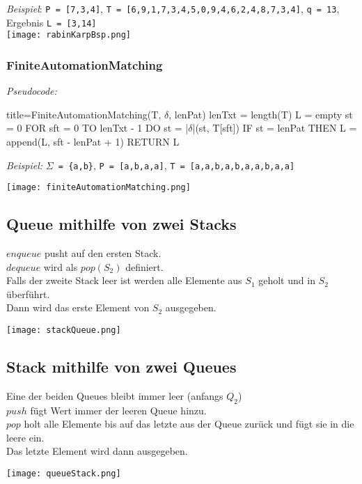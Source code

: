 \noindent
\textit{Beispiel}: \texttt{P = [7,3,4]}, \texttt{T = [6,9,1,7,3,4,5,0,9,4,6,2,4,8,7,3,4]}, \texttt{q = 13}, Ergebnis \texttt{L = [3,14]} \\
\texttt{[image: rabinKarpBsp.png]}

\subsubsection*{FiniteAutomationMatching}
\textit{Pseudocode:}
\begin{ccode}[autogobble,escapeinside=||]{title={FiniteAutomationMatching(T, $\delta$, lenPat)}}
lenTxt = length(T)
L = empty
st = 0
FOR sft = 0 TO lenTxt - 1 DO
    st = |$\delta$|(st, T[sft])
    IF st = lenPat THEN
        L = append(L, sft - lenPat + 1)
RETURN L
\end{ccode}

\noindent
\textit{Beispiel:} \texttt{$\Sigma$ = \{a,b\}}, \texttt{P = [a,b,a,a]}, \texttt{T = [a,a,b,a,b,a,a,b,a,a]} \\
\centerline{\texttt{[image: finiteAutomationMatching.png]}}


\subsection*{Queue mithilfe von zwei Stacks}

$enqueue$ pusht auf den ersten Stack. \\
$dequeue$ wird als $pop(S_2)$ definiert. \\
Falls der zweite Stack leer ist werden alle Elemente aus $S_1$ geholt und in $S_2$ überführt. \\
Dann wird das erste Element von $S_2$ ausgegeben. \\
\centerline{\texttt{[image: stackQueue.png]}}

\subsection*{Stack mithilfe von zwei Queues}

Eine der beiden Queues bleibt immer leer (anfangs $Q_2$) \\
$push$ fügt Wert immer der leeren Queue hinzu. \\
$pop$ holt alle Elemente bis auf das letzte aus der Queue zurück und fügt sie in die leere ein. \\
Das letzte Element wird dann ausgegeben. \\
\centerline{\texttt{[image: queueStack.png]}}

